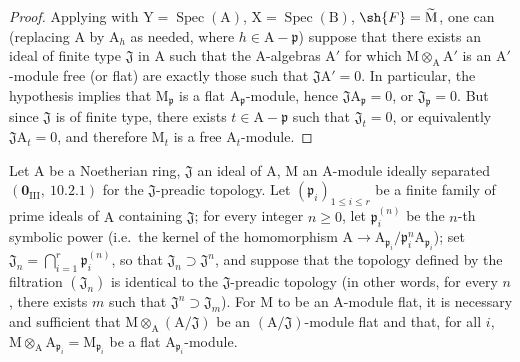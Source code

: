 \begin{proof}
Applying  with $\mathrm{Y}=\operatorname{Spec}(\mathrm{A})$, $\mathrm{X}=\operatorname{Spec}(\mathrm{B})$, $\sh{F}=\widetilde{\mathrm{M}}$, one can (replacing
$\mathrm{A}$ by $\mathrm{A}_h$ as needed, where $h\in\mathrm{A}-\mathfrak{p}$) suppose that there exists an ideal of finite type $\mathfrak{J}$ in $\mathrm{A}$
such that the $\mathrm{A}$-algebras $\mathrm{A}'$ for which $\mathrm{M}\otimes_\mathrm{A}\mathrm{A}'$ is an $\mathrm{A}'$-module free (or flat) are
exactly those such that $\mathfrak{J}\mathrm{A}'=0$. In particular, the hypothesis implies that $\mathrm{M}_\mathfrak{p}$ is a flat
$\mathrm{A}_\mathfrak{p}$-module, hence $\mathfrak{J}\mathrm{A}_\mathfrak{p}=0$, or $\mathfrak{J}_\mathfrak{p}=0$. But since $\mathfrak{J}$ is of finite type, there
exists $t\in\mathrm{A}-\mathfrak{p}$ such that $\mathfrak{J}_t=0$, or equivalently $\mathfrak{J}\mathrm{A}_t=0$, and therefore $\mathrm{M}_t$ is a free $\mathrm{A}_t$-module.
\end{proof}

\begin{proposition}[11.4.7]
\label{IV.11.4.7}
Let $\mathrm{A}$ be a Noetherian ring, $\mathfrak{J}$ an ideal of $\mathrm{A}$, $\mathrm{M}$ an $\mathrm{A}$-module
ideally separated $(\mathbf{0}_{\mathrm{III}},~10.2.1)$ for the $\mathfrak{J}$-preadic topology. Let $(\mathfrak{p}_i)_{1\leq i\leq r}$ be a finite family
of prime ideals of $\mathrm{A}$ containing $\mathfrak{J}$; for every integer $n\geq 0$, let $\mathfrak{p}_i^{(n)}$ be the $n$-th symbolic
power (i.e.\ the kernel of the homomorphism $\mathrm{A}\to\mathrm{A}_{\mathfrak{p}_i}/\mathfrak{p}_i^n\mathrm{A}_{\mathfrak{p}_i}$); set $\mathfrak{J}_n=\bigcap_{i=1}^{r}\mathfrak{p}_i^{(n)}$, so that $\mathfrak{J}_n\supset\mathfrak{J}^n$,
and suppose that the topology defined by the filtration $(\mathfrak{J}_n)$ is identical to the $\mathfrak{J}$-preadic topology
(in other words, for every $n$, there exists $m$ such that $\mathfrak{J}^n\supset\mathfrak{J}_m$). For $\mathrm{M}$ to be an $\mathrm{A}$-module flat,
it is necessary and sufficient that $\mathrm{M}\otimes_\mathrm{A}(\mathrm{A}/\mathfrak{J})$ be an $(\mathrm{A}/\mathfrak{J})$-module flat and that, for all $i$, $\mathrm{M}\otimes_\mathrm{A}\mathrm{A}_{\mathfrak{p}_i}=\mathrm{M}_{\mathfrak{p}_i}$
be a flat $\mathrm{A}_{\mathfrak{p}_i}$-module.
\end{proposition}

